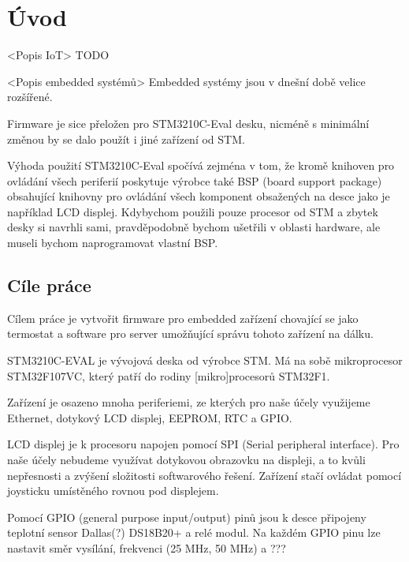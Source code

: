 \chapter*{Úvod}

<Popis IoT>
TODO

<Popis embedded systémů>
Embedded systémy jsou v dnešní době velice rozšířené.

Firmware je sice přeložen pro STM3210C-Eval desku, nicméně s minimální změnou by
se dalo použít i jiné zařízení od STM.

Výhoda použití STM3210C-Eval spočívá zejména v tom, že kromě knihoven pro ovládání
všech periferií poskytuje výrobce také BSP (board support package) obsahující
knihovny pro ovládání všech komponent obsažených na desce jako je například LCD
displej.
Kdybychom použili pouze procesor od STM a zbytek desky si navrhli sami, pravděpodobně
bychom ušetřili v oblasti hardware, ale museli bychom naprogramovat vlastní BSP.

\section{Cíle práce}
Cílem práce je vytvořit firmware pro embedded zařízení chovající se jako termostat
a software pro server umožňující správu tohoto zařízení na dálku.

STM3210C-EVAL je vývojová deska od výrobce STM. Má na sobě mikroprocesor STM32F107VC,
který patří do rodiny [mikro]procesorů STM32F1.

Zařízení je osazeno mnoha periferiemi, ze kterých pro naše účely využijeme Ethernet,
dotykový LCD displej, EEPROM, RTC a GPIO.

LCD displej je k procesoru napojen pomocí SPI (Serial peripheral interface).
Pro naše účely nebudeme využívat dotykovou obrazovku na displeji, a to kvůli nepřesnosti a
zvýšení složitosti softwarového řešení.
Zařízení stačí ovládat pomocí joysticku umístěného rovnou pod displejem.

Pomocí GPIO (general purpose input/output) pinů jsou k desce připojeny teplotní sensor
Dallas(?) DS18B20+ a relé modul.
Na každém GPIO pinu lze nastavit směr vysílání, frekvenci (25 MHz, 50 MHz) a ???